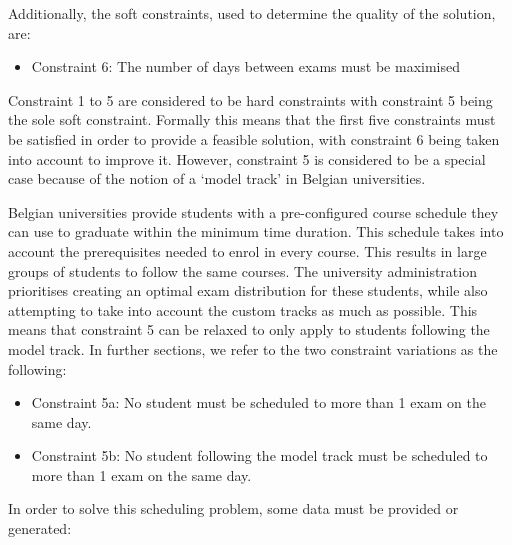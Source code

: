Additionally, the soft constraints, used to determine the quality of the solution, are:
\begin{itemize}
    \item Constraint 6: The number of days between exams must be maximised
\end{itemize}
Constraint 1 to 5 are considered to be hard constraints with constraint 5 being the sole soft constraint. Formally this means that the first five constraints must be satisfied in order to provide a feasible solution, with constraint 6 being taken into account to improve it. However, constraint 5 is considered to be a special case because of the notion of a ‘model track’ in Belgian universities.

Belgian universities provide students with a pre-configured course schedule they can use to graduate within the minimum time duration. This schedule takes into account the prerequisites needed to enrol in every course. This results in large groups of students to follow the same courses. The university administration prioritises creating an optimal exam distribution for these students, while also attempting to take into account the custom tracks as much as possible. This means that constraint 5 can be relaxed to only apply to students following the model track. In further sections, we refer to the two constraint variations as the following:
\begin{itemize}
    \item Constraint 5a: No student must be scheduled to more than 1 exam on the same day.
    \item Constraint 5b: No student following the model track must be scheduled to more than 1 exam on the same day.

\end{itemize}

In order to solve this scheduling problem, some data must be provided or generated:

